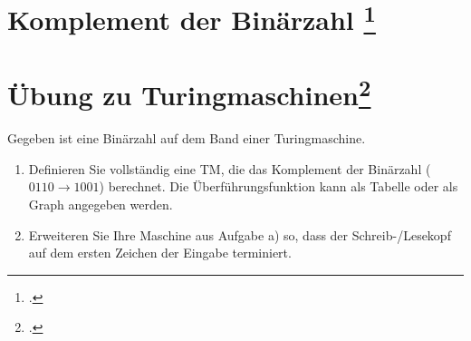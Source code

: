 \documentclass{lehramt-informatik-aufgabe}
\begin{document}
\section{Komplement der Binärzahl
\footcite[Seite 22]{theo:fs:3}}


\section{Übung zu Turingmaschinen\footcite{theo:fs:3}}

Gegeben ist eine Binärzahl auf dem Band einer Turingmaschine.

\begin{enumerate}
\item Definieren Sie vollständig eine TM, die das Komplement der
Binärzahl ($0110 \rightarrow 1001$) berechnet. Die Überführungsfunktion
kann als Tabelle oder als Graph angegeben werden.

\begin{liAntwort}
\begin{center}
\end{center}
\end{liAntwort}

\item Erweiteren Sie Ihre Maschine aus Aufgabe a) so, dass der
Schreib-/Lesekopf auf dem ersten Zeichen der Eingabe terminiert.

\begin{liAntwort}
\begin{center}
\end{center}
\end{liAntwort}
\end{enumerate}
\end{document}
